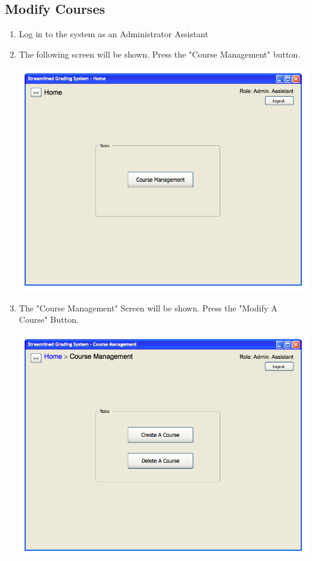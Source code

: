 \documentclass{article}
\begin{document}
\subsection{Modify Courses}
\begin{enumerate}
 \item Log in to the system as an Administrator Assistant
\item The following screen will be shown. Press the "Course Management" button.

\includegraphics[scale=0.55]{../images/UIMockups/pngs/adminassisthomepage} 

\item The "Course Management" Screen will be shown. Press the "Modify A Course" Button.


\includegraphics[scale=0.55]{../images/UIMockups/pngs/Coursemanagement}




\end{enumerate}
\end{document}
